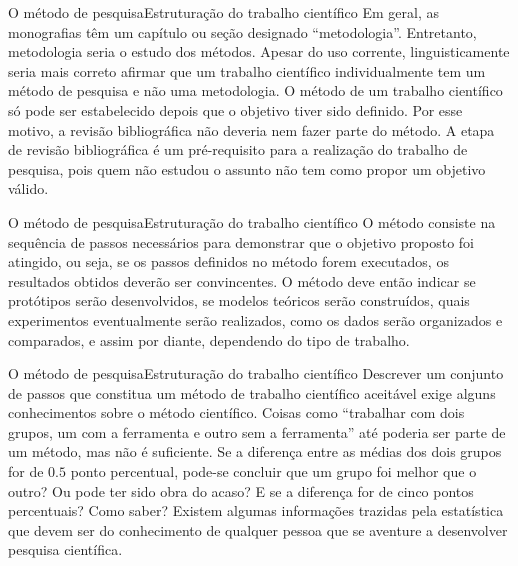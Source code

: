 \documentclass[t]{beamer}
\begin{document}

\begin{ftst}{O método de pesquisa}{Estruturação do trabalho científico}
\justifying
Em geral, as monografias têm um capítulo ou seção designado “metodologia”. Entretanto, metodologia seria o estudo dos métodos. Apesar do uso corrente, linguisticamente seria mais correto afirmar que um trabalho científico individualmente tem um método de pesquisa e não uma metodologia. 
\vone
O método de um trabalho científico só pode ser estabelecido depois que o objetivo tiver sido definido. Por esse motivo, a revisão bibliográfica não deveria nem fazer parte do método.
\vone
A etapa de revisão bibliográfica é um pré-requisito para a realização do trabalho de pesquisa, pois quem não estudou o assunto não tem como propor um objetivo válido.

\end{ftst}


\begin{ftst}{O método de pesquisa}{Estruturação do trabalho científico}
\justifying
O método consiste na sequência de passos necessários para demonstrar que o objetivo proposto foi atingido, ou seja, se os passos definidos no método forem executados, os resultados obtidos deverão ser convincentes.
\vone
O método deve então indicar se protótipos serão desenvolvidos, se modelos teóricos serão construídos, quais experimentos eventualmente serão realizados, como os dados serão organizados
e comparados, e assim por diante, dependendo do tipo de trabalho.


\end{ftst}


\begin{ftst}{O método de pesquisa}{Estruturação do trabalho científico}
\justifying
Descrever um conjunto de passos que constitua um método de trabalho científico aceitável exige alguns conhecimentos sobre o método científico.
\vone
Coisas como “trabalhar com dois grupos, um com a ferramenta e outro sem a ferramenta” até poderia
ser parte de um método, mas não é suficiente. 
\vone
Se a diferença entre as médias dos dois grupos for de $0.5$ ponto percentual, pode-se concluir que um grupo foi melhor que o outro? Ou pode ter sido obra do acaso? E se a diferença for de cinco pontos percentuais?
\vone
Como saber? Existem algumas informações trazidas pela estatística que devem ser do conhecimento de qualquer pessoa que se aventure a desenvolver pesquisa científica.

\end{ftst}
\end{document}

